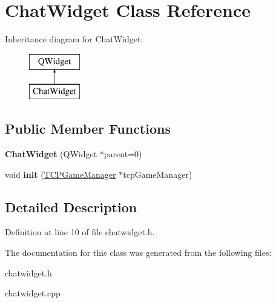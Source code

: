 \hypertarget{class_chat_widget}{\section{Chat\-Widget Class Reference}
\label{class_chat_widget}
}
Inheritance diagram for Chat\-Widget\-:\begin{figure}[H]
\begin{center}
\leavevmode
\includegraphics[height=2.000000cm]{class_chat_widget}
\end{center}
\end{figure}
\subsection*{Public Member Functions}
\begin{DoxyCompactItemize}
\item 
\hypertarget{class_chat_widget_a605bb01b4520874d34e3882edb70be38}{{\bfseries Chat\-Widget} (Q\-Widget $\ast$parent=0)}\label{class_chat_widget_a605bb01b4520874d34e3882edb70be38}

\item 
\hypertarget{class_chat_widget_a0919f7952cb4525f7966411a2c36da8f}{void {\bfseries init} (\hyperlink{class_t_c_p_game_manager}{T\-C\-P\-Game\-Manager} $\ast$tcp\-Game\-Manager)}\label{class_chat_widget_a0919f7952cb4525f7966411a2c36da8f}

\end{DoxyCompactItemize}


\subsection{Detailed Description}


Definition at line 10 of file chatwidget.\-h.



The documentation for this class was generated from the following files\-:\begin{DoxyCompactItemize}
\item 
chatwidget.\-h\item 
chatwidget.\-cpp\end{DoxyCompactItemize}
